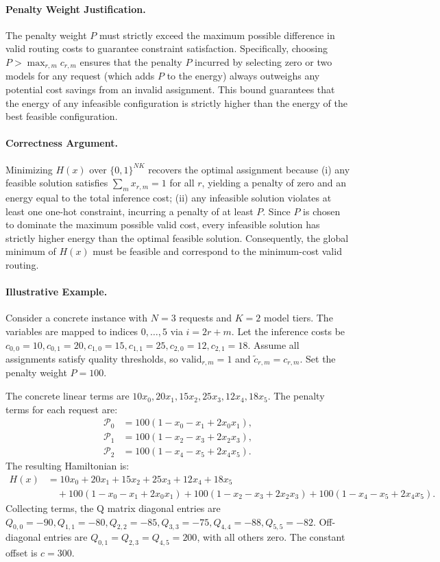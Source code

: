 \documentclass[12pt]{article}
\begin{document}
\paragraph{Penalty Weight Justification.}
The penalty weight $P$ must strictly exceed the maximum possible difference in valid routing costs to guarantee constraint satisfaction. Specifically, choosing $P > \max_{r,m} c_{r,m}$ ensures that the penalty $P$ incurred by selecting zero or two models for any request (which adds $P$ to the energy) always outweighs any potential cost savings from an invalid assignment. This bound guarantees that the energy of any infeasible configuration is strictly higher than the energy of the best feasible configuration.

\paragraph{Correctness Argument.}
Minimizing $H(x)$ over $\{0,1\}^{NK}$ recovers the optimal assignment because (i) any feasible solution satisfies $\sum_{m} x_{r,m} = 1$ for all $r$, yielding a penalty of zero and an energy equal to the total inference cost; (ii) any infeasible solution violates at least one one-hot constraint, incurring a penalty of at least $P$. Since $P$ is chosen to dominate the maximum possible valid cost, every infeasible solution has strictly higher energy than the optimal feasible solution. Consequently, the global minimum of $H(x)$ must be feasible and correspond to the minimum-cost valid routing.

\paragraph{Illustrative Example.}
Consider a concrete instance with $N=3$ requests and $K=2$ model tiers. The variables are mapped to indices $0,\dots,5$ via $i = 2r + m$. Let the inference costs be $c_{0,0}=10, c_{0,1}=20, c_{1,0}=15, c_{1,1}=25, c_{2,0}=12, c_{2,1}=18$. Assume all assignments satisfy quality thresholds, so $\text{valid}_{r,m}=1$ and $\tilde{c}_{r,m} = c_{r,m}$. Set the penalty weight $P=100$.

The concrete linear terms are $10x_0, 20x_1, 15x_2, 25x_3, 12x_4, 18x_5$. The penalty terms for each request are:
\begin{align}
    \mathcal{P}_0 &= 100(1 - x_0 - x_1 + 2x_0x_1), \\
    \mathcal{P}_1 &= 100(1 - x_2 - x_3 + 2x_2x_3), \\
    \mathcal{P}_2 &= 100(1 - x_4 - x_5 + 2x_4x_5).
\end{align}
The resulting Hamiltonian is:
\begin{align}
    H(x) &= 10x_0 + 20x_1 + 15x_2 + 25x_3 + 12x_4 + 18x_5 \\
    &\quad + 100(1 - x_0 - x_1 + 2x_0x_1) + 100(1 - x_2 - x_3 + 2x_2x_3) + 100(1 - x_4 - x_5 + 2x_4x_5).
\end{align}
Collecting terms, the Q matrix diagonal entries are $Q_{0,0}=-90, Q_{1,1}=-80, Q_{2,2}=-85, Q_{3,3}=-75, Q_{4,4}=-88, Q_{5,5}=-82$. Off-diagonal entries are $Q_{0,1}=Q_{2,3}=Q_{4,5}=200$, with all others zero. The constant offset is $c=300$.
\end{document}
